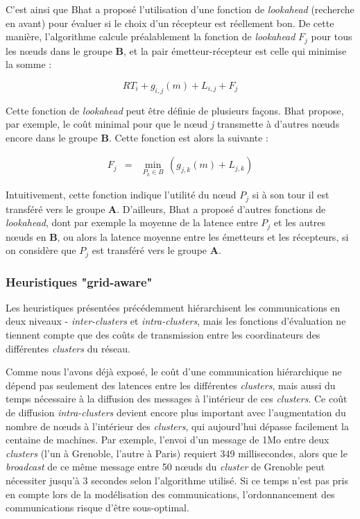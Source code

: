 C'est ainsi que Bhat a proposé l'utilisation d'une fonction de \emph{lookahead}
(recherche en avant) pour évaluer si le choix d'un récepteur est réellement
bon. De cette manière, l'algorithme calcule préalablement la fonction
de \emph{lookahead} $F_{j}$ pour tous les n{\oe}uds dans le groupe
\textbf{B}, et la pair émetteur-récepteur est celle qui minimise
la somme :

\[
RT_{i}+g_{i,j}(m)+L_{i,j}+F_{j}\]


Cette fonction de \emph{lookahead} peut être définie de plusieurs
façons. Bhat \cite{Bhat03} propose, par exemple, le coût minimal
pour que le n{\oe}ud \emph{j} transmette à d'autres n{\oe}uds encore
dans le groupe \textbf{B}. Cette fonction est alors la suivante :

\begin{eqnarray*}
	F_{j} & = & \min_{P_{k}\in B}\,(g_{j,k}(m)+L_{j,k})\end{eqnarray*}


Intuitivement, cette fonction indique l'utilité du n{\oe}ud $P_{j}$
si à son tour il est transféré vers le groupe \textbf{A}. D'ailleurs,
Bhat a proposé d'autres fonctions de \emph{lookahead}, dont par exemple
la moyenne de la latence entre $P_{j}$ et les autres n{\oe}uds en
\textbf{B}, ou alors la latence moyenne entre les émetteurs et les
récepteurs, si on considère que $P_{j}$ est transféré vers le groupe
\textbf{A}. 


\subsubsection{Heuristiques "grid-aware"}

Les heuristiques présentées précédemment hiérarchisent les communications en deux niveaux - \emph{inter-clusters}
et \emph{intra-clusters}, mais les fonctions d'évaluation ne tiennent compte que des coûts de transmission entre les coordinateurs
des différentes  \textit{clusters} du réseau.

Comme nous l'avons déjà exposé, le coût d'une communication
hiérarchique ne dépend pas seulement des latences entre les différentes
 \textit{clusters}, mais aussi du temps nécessaire à la diffusion des messages
à l'intérieur de ces  \textit{clusters}. Ce coût de diffusion \textit{intra-clusters} devient
encore plus important avec l'augmentation du nombre de n{\oe}uds à l'intérieur
des  \textit{clusters}, qui aujourd'hui dépasse facilement la centaine de machines.
Par exemple, l'envoi d'un message de 1Mo entre deux \textit{clusters} (l'un à Grenoble, l'autre à Paris) requiert 349 millisecondes, alors que
le \textit{broadcast} de ce même message entre 50 n{\oe}uds du \textit{cluster} de Grenoble
peut nécessiter jusqu'à 3 secondes selon l'algorithme
utilisé. Si ce temps n'est pas pris en compte lors de la modélisation
des communications, l'ordonnancement des communications risque d'être
sous-optimal.

